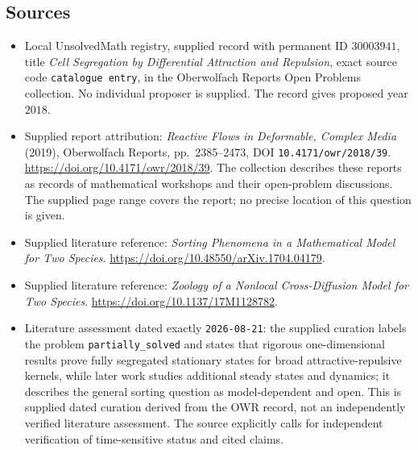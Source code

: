\documentclass[11pt]{article}
\begin{document}
\subsection{Sources}
\begin{itemize}
\item Local UnsolvedMath registry, supplied record with permanent ID \(30003941\), title \emph{Cell Segregation by Differential Attraction and Repulsion}, exact source code \texttt{catalogue entry}, in the Oberwolfach Reports Open Problems collection. No individual proposer is supplied. The record gives proposed year \(2018\).
\item Supplied report attribution: \emph{Reactive Flows in Deformable, Complex Media} (2019), Oberwolfach Reports, pp.\ 2385--2473, DOI \texttt{10.4171/owr/2018/39}. \url{https://doi.org/10.4171/owr/2018/39}. The collection describes these reports as records of mathematical workshops and their open-problem discussions. The supplied page range covers the report; no precise location of this question is given.
\item Supplied literature reference: \emph{Sorting Phenomena in a Mathematical Model for Two Species}. \url{https://doi.org/10.48550/arXiv.1704.04179}.
\item Supplied literature reference: \emph{Zoology of a Nonlocal Cross-Diffusion Model for Two Species}. \url{https://doi.org/10.1137/17M1128782}.
\item Literature assessment dated exactly \texttt{2026-08-21}: the supplied curation labels the problem \texttt{partially\_solved} and states that rigorous one-dimensional results prove fully segregated stationary states for broad attractive-repulsive kernels, while later work studies additional steady states and dynamics; it describes the general sorting question as model-dependent and open. This is supplied dated curation derived from the OWR record, not an independently verified literature assessment. The source explicitly calls for independent verification of time-sensitive status and cited claims.
\end{itemize}
\end{document}
